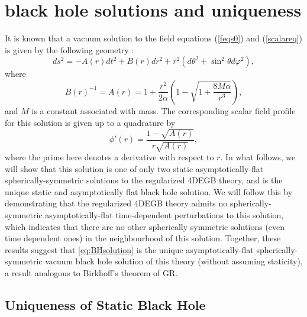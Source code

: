 \documentclass[reprint,amsmath,amssymbGaps,onecolumn,notitlepage,nofootinbib]{revtex4-1}
\begin{document}
\section{black hole solutions and uniqueness}
\label{sec:uniqeness}

It is known that a vacuum solution to the field equations (\ref{feqs0}) and (\ref{scalareq}) is given by the following geometry \cite{Glavan:2019inb,Lu:2020iav}:
\begin{equation}
ds^2=-A(r) dt^2 + B(r) dr^2 + r^2\left(d\theta^2 + \sin^2 \theta d\varphi^2\right), 
\label{eq:ds2}
\end{equation}
where
\begin{equation}
B(r)^{-1}=A(r)=1+\frac{r^2}{2 \alpha} \left(1-\sqrt{1+\frac{8M\alpha}{r^3}} \right), 
\label{eq:BHsolution}
\end{equation}
and $M$ is a constant associated with mass. The corresponding scalar field profile for this solution is given up to a quadrature by
\begin{equation}
\phi'(r)=\frac{1-\sqrt{A(r)}}{r\sqrt{A(r)}},
\end{equation}
where the prime here denotes a derivative with respect to $r$. In what follows, we will show that this solution is one of only two static asymptotically-flat spherically-symmetric solutions to the regularized 4DEGB theory, and is the unique static and asymptotically flat black hole solution. We will follow this by demonstrating that the regularized 4DEGB theory admits no spherically-symmetric asymptotically-flat time-dependent perturbations to this solution, which indicates that there are no other spherically symmetric solutions (even time dependent ones) in the neighbourhood of this solution. Together, these results suggest that \eqref{eq:BHsolution} is the unique asymptotically-flat spherically-symmetric vacuum black hole solution of this theory (without assuming staticity), a result analogous to Birkhoff's theorem of GR.


\subsection{Uniqueness of Static Black Hole}
\label{sec:uniqueStat}
\end{document}
